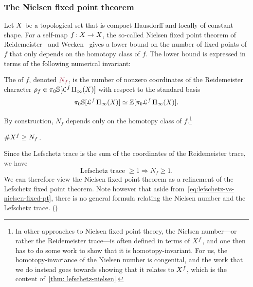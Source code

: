 \subsubsection{The Nielsen fixed point theorem}\label{subsec:classical-nielsen}
Let $X$ be a topological set that is compact Hausdorff and locally of constant shape. For a self-map $f\colon X\to X$, the so-called Nielsen fixed point theorem of Reidemeister~\cite{Reidemeister1936} and Wecken~\cite{Wecken1941a,Wecken1941b,Wecken1942} gives a lower bound on the number of fixed points of $f$ that only depends on the homotopy class of $f$. The lower bound is expressed in terms of the following numerical invariant:
\begin{defn}\label{defn: Nielsen number}
  The  of $f$, denoted $\mdef{N_f}$, is the number of nonzero coordinates of the Reidemeister character $\rho_f\in\pi_0\SS\lbrack\cL^f\ani{\tset}\rbrack$ with respect to the standard basis
  \begin{equation}
    \label{eq:standard-basis-of-reidemeister-target}
    \pi_0\SS\lbrack\cL^f\ani{\tset}\rbrack\simeq\ZZ\lbrack\pi_0\cL^f\ani{\tset}\rbrack.
  \end{equation}
\end{defn}
By construction, $N_f$ depends only on the homotopy class of $f$.\footnote{In other approaches to Nielsen fixed point theory, the Nielsen number---or rather the Reidemeister trace---is often defined in terms of $X^f$, and one then has to do some work to show that it is homotopy-invariant. For us, the homotopy-invariance of the Nielsen number is congenital, and the work that we do instead goes towards showing that it relates to $X^f$, which is the content of~\cref{thm: lefschetz-nielsen}.}
\begin{prop}
  $\#X^f \geq N_f\,$.
\end{prop}
Since the Lefschetz trace is the sum of the coordinates of the Reidemeister trace, we have
\begin{equation}
  \label{eq:lefschetz-vs-nielsen-fixed-pt}
  \text{Lefschetz trace }\geq 1\Rightarrow N_f\geq 1.
\end{equation}
We can therefore view the Nielsen fixed point theorem as a refinement of the Lefschetz fixed point theorem. Note however that aside from~\eqref{eq:lefschetz-vs-nielsen-fixed-pt}, there is no general formula relating the Nielsen number and the Lefschetz trace. ()
